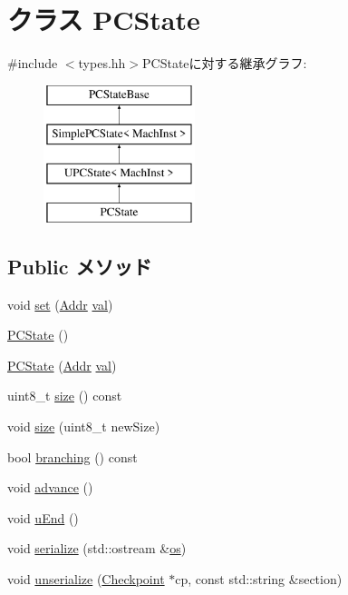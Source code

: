 \hypertarget{classX86ISA_1_1PCState}{
\section{クラス PCState}
\label{classX86ISA_1_1PCState}
}


{\ttfamily \#include $<$types.hh$>$}PCStateに対する継承グラフ:\begin{figure}[H]
\begin{center}
\leavevmode
\includegraphics[height=4cm]{classX86ISA_1_1PCState}
\end{center}
\end{figure}
\subsection*{Public メソッド}
\begin{DoxyCompactItemize}
\item 
void \hyperlink{classX86ISA_1_1PCState_a9a5b900e841dd75dc81970850547918f}{set} (\hyperlink{base_2types_8hh_af1bb03d6a4ee096394a6749f0a169232}{Addr} \hyperlink{namespaceX86ISA_ae13bf1250853ff6b72aabe3c79b587cc}{val})
\item 
\hyperlink{classX86ISA_1_1PCState_af0fc4eddc36ef2caf56cce899bb3e252}{PCState} ()
\item 
\hyperlink{classX86ISA_1_1PCState_a52e3b52fc58e6f5d06eb20d00ba016b1}{PCState} (\hyperlink{base_2types_8hh_af1bb03d6a4ee096394a6749f0a169232}{Addr} \hyperlink{namespaceX86ISA_ae13bf1250853ff6b72aabe3c79b587cc}{val})
\item 
uint8\_\-t \hyperlink{classX86ISA_1_1PCState_a9a3afed8ccfa04ad21f51926ad1dae6a}{size} () const 
\item 
void \hyperlink{classX86ISA_1_1PCState_a8f6acca1b2ed4d3f1f51c8711e91be2e}{size} (uint8\_\-t newSize)
\item 
bool \hyperlink{classX86ISA_1_1PCState_ae3f0eb15a9382eefff6b00cf7999c2e3}{branching} () const 
\item 
void \hyperlink{classX86ISA_1_1PCState_a8903a4e9f3d5fb42d0faa9d53e21d85c}{advance} ()
\item 
void \hyperlink{classX86ISA_1_1PCState_a2f3cdfc88ed61928bd28242996e0f86e}{uEnd} ()
\item 
void \hyperlink{classX86ISA_1_1PCState_a53e036786d17361be4c7320d39c99b84}{serialize} (std::ostream \&\hyperlink{namespaceX86ISA_a6b6e6ba763e7eaf46ac5b6372ca98d30}{os})
\item 
void \hyperlink{classX86ISA_1_1PCState_af22e5d6d660b97db37003ac61ac4ee49}{unserialize} (\hyperlink{classCheckpoint}{Checkpoint} $\ast$cp, const std::string \&section)
\end{DoxyCompactItemize}
